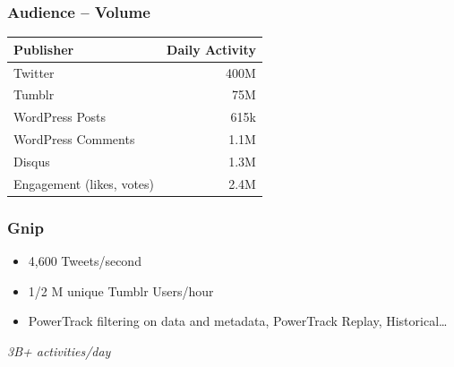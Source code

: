 \documentclass{beamer}
\begin{document}

\begin{frame} \frametitle{Audience -- Volume}
\begin{table}
\begin{tabular}{l|r}
\hline
   {Publisher}   &   {Daily Activity}   \\ [1pt]
\hline 
    Twitter      &      400M   \\
    Tumblr      &        75M   \\
    WordPress Posts &     615k   \\
    WordPress Comments & 1.1M \\
    Disqus       &       1.3M  \\
    Engagement (likes, votes) & 2.4M  \\
\hline
\end{tabular}
\end{table}
\end{frame}

\begin{frame}\frametitle{Gnip}
\Large{
\begin{itemize}
\item 4,600 Tweets/second \\ [2pt]
\item 1/2 M unique Tumblr Users/hour \\  [2pt]
\item PowerTrack filtering on data and metadata, PowerTrack Replay, Historical\ldots \\  [15pt]
\end{itemize}
}
\begin{center}
\Huge{\emph{3B+ activities/day}}
\end{center}
\end{frame}


\begin{frame}
\begin{center}
\end{center}
\end{frame}

%
\end{document}
